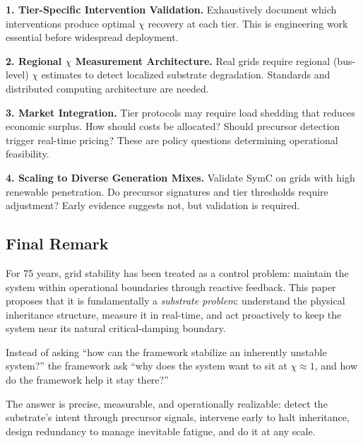 \documentclass[11pt,letterpaper]{article}
\begin{document}
\textbf{1. Tier-Specific Intervention Validation.}
Exhaustively document which interventions produce optimal $\chi$ recovery at each tier. This is engineering work essential before widespread deployment.

\textbf{2. Regional $\chi$ Measurement Architecture.}
Real grids require regional (bus-level) $\chi$ estimates to detect localized substrate degradation. Standards and distributed computing architecture are needed.

\textbf{3. Market Integration.}
Tier protocols may require load shedding that reduces economic surplus. How should costs be allocated? Should precursor detection trigger real-time pricing? These are policy questions determining operational feasibility.

\textbf{4. Scaling to Diverse Generation Mixes.}
Validate SymC on grids with high renewable penetration. Do precursor signatures and tier thresholds require adjustment? Early evidence suggests not, but validation is required.

\subsection{Final Remark}

For 75 years, grid stability has been treated as a control problem: maintain the system within operational boundaries through reactive feedback. This paper proposes that it is fundamentally a \textit{substrate problem}: understand the physical inheritance structure, measure it in real-time, and act proactively to keep the system near its natural critical-damping boundary.

Instead of asking ``how can the framework stabilize an inherently unstable system?'' the framework ask ``why does the system want to sit at $\chi \approx 1$, and how do the framework help it stay there?''

The answer is precise, measurable, and operationally realizable: detect the substrate's intent through precursor signals, intervene early to halt inheritance, design redundancy to manage inevitable fatigue, and do it at any scale.
\end{document}
